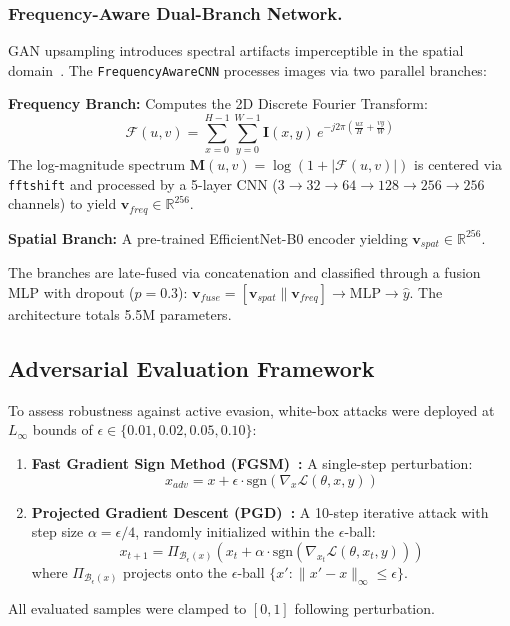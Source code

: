 \documentclass[runningheads]{llncs}
\begin{document}
\subsubsection{Frequency-Aware Dual-Branch Network.}
GAN upsampling introduces spectral artifacts imperceptible in the spatial domain~\cite{frequency_analysis}. The \texttt{FrequencyAwareCNN} processes images via two parallel branches:

\textbf{Frequency Branch:} Computes the 2D Discrete Fourier Transform:
\begin{equation}
    \mathcal{F}(u,v) = \sum_{x=0}^{H-1} \sum_{y=0}^{W-1} \mathbf{I}(x,y) \, e^{-j2\pi\left(\frac{ux}{H} + \frac{vy}{W}\right)}
\end{equation}
The log-magnitude spectrum $\mathbf{M}(u,v) = \log(1 + |\mathcal{F}(u,v)|)$ is centered via \texttt{fftshift} and processed by a 5-layer CNN ($3 \rightarrow 32 \rightarrow 64 \rightarrow 128 \rightarrow 256 \rightarrow 256$ channels) to yield $\mathbf{v}_{freq} \in \mathbb{R}^{256}$.

\textbf{Spatial Branch:} A pre-trained EfficientNet-B0 encoder yielding $\mathbf{v}_{spat} \in \mathbb{R}^{256}$.

The branches are late-fused via concatenation and classified through a fusion MLP with dropout ($p=0.3$):
$\mathbf{v}_{fuse} = [\mathbf{v}_{spat} \parallel \mathbf{v}_{freq}] \rightarrow \text{MLP} \rightarrow \hat{y}$.
The architecture totals 5.5M parameters.

\subsection{Adversarial Evaluation Framework}
To assess robustness against active evasion, white-box attacks were deployed at $L_\infty$ bounds of $\epsilon \in \{0.01, 0.02, 0.05, 0.10\}$:
\begin{enumerate}
    \item \textbf{Fast Gradient Sign Method (FGSM)~\cite{fgsm}:} A single-step perturbation:
    \begin{equation}
        x_{adv} = x + \epsilon \cdot \text{sgn}(\nabla_x \mathcal{L}(\theta, x, y))
    \end{equation}
    \item \textbf{Projected Gradient Descent (PGD)~\cite{pgd}:} A 10-step iterative attack with step size $\alpha = \epsilon/4$, randomly initialized within the $\epsilon$-ball:
    \begin{equation}
        x_{t+1} = \Pi_{\mathcal{B}_\epsilon(x)} \left( x_t + \alpha \cdot \text{sgn}(\nabla_{x_t} \mathcal{L}(\theta, x_t, y)) \right)
    \end{equation}
    where $\Pi_{\mathcal{B}_\epsilon(x)}$ projects onto the $\epsilon$-ball $\{x' : \|x' - x\|_\infty \leq \epsilon\}$.
\end{enumerate}
All evaluated samples were clamped to $[0, 1]$ following perturbation.
\end{document}
